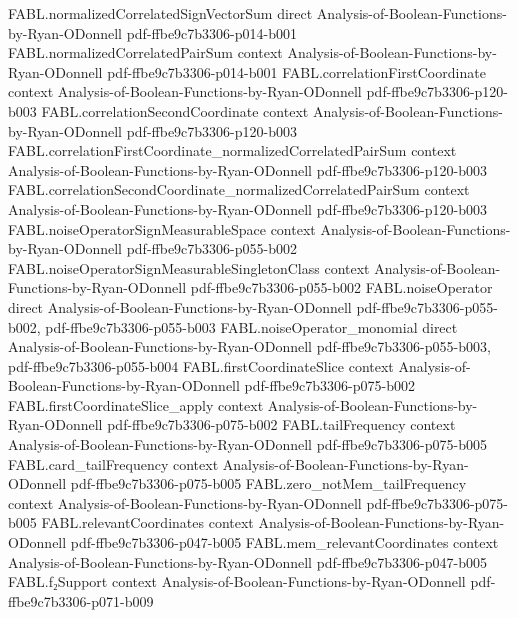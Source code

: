 \begin{theorem}
\proofstep
  {FABL.normalizedCorrelatedSignVectorSum}
  {direct}
  {Analysis-of-Boolean-Functions-by-Ryan-ODonnell}
  {pdf-ffbe9c7b3306-p014-b001}
\proofstep
  {FABL.normalizedCorrelatedPairSum}
  {context}
  {Analysis-of-Boolean-Functions-by-Ryan-ODonnell}
  {pdf-ffbe9c7b3306-p014-b001}
\proofstep
  {FABL.correlationFirstCoordinate}
  {context}
  {Analysis-of-Boolean-Functions-by-Ryan-ODonnell}
  {pdf-ffbe9c7b3306-p120-b003}
\proofstep
  {FABL.correlationSecondCoordinate}
  {context}
  {Analysis-of-Boolean-Functions-by-Ryan-ODonnell}
  {pdf-ffbe9c7b3306-p120-b003}
\proofstep
  {FABL.correlationFirstCoordinate_normalizedCorrelatedPairSum}
  {context}
  {Analysis-of-Boolean-Functions-by-Ryan-ODonnell}
  {pdf-ffbe9c7b3306-p120-b003}
\proofstep
  {FABL.correlationSecondCoordinate_normalizedCorrelatedPairSum}
  {context}
  {Analysis-of-Boolean-Functions-by-Ryan-ODonnell}
  {pdf-ffbe9c7b3306-p120-b003}
\proofstep
  {FABL.noiseOperatorSignMeasurableSpace}
  {context}
  {Analysis-of-Boolean-Functions-by-Ryan-ODonnell}
  {pdf-ffbe9c7b3306-p055-b002}
\proofstep
  {FABL.noiseOperatorSignMeasurableSingletonClass}
  {context}
  {Analysis-of-Boolean-Functions-by-Ryan-ODonnell}
  {pdf-ffbe9c7b3306-p055-b002}
\proofstep
  {FABL.noiseOperator}
  {direct}
  {Analysis-of-Boolean-Functions-by-Ryan-ODonnell}
  {pdf-ffbe9c7b3306-p055-b002,
    pdf-ffbe9c7b3306-p055-b003}
\proofstep
  {FABL.noiseOperator_monomial}
  {direct}
  {Analysis-of-Boolean-Functions-by-Ryan-ODonnell}
  {pdf-ffbe9c7b3306-p055-b003,
    pdf-ffbe9c7b3306-p055-b004}
\proofstep
  {FABL.firstCoordinateSlice}
  {context}
  {Analysis-of-Boolean-Functions-by-Ryan-ODonnell}
  {pdf-ffbe9c7b3306-p075-b002}
\proofstep
  {FABL.firstCoordinateSlice_apply}
  {context}
  {Analysis-of-Boolean-Functions-by-Ryan-ODonnell}
  {pdf-ffbe9c7b3306-p075-b002}
\proofstep
  {FABL.tailFrequency}
  {context}
  {Analysis-of-Boolean-Functions-by-Ryan-ODonnell}
  {pdf-ffbe9c7b3306-p075-b005}
\proofstep
  {FABL.card_tailFrequency}
  {context}
  {Analysis-of-Boolean-Functions-by-Ryan-ODonnell}
  {pdf-ffbe9c7b3306-p075-b005}
\proofstep
  {FABL.zero_notMem_tailFrequency}
  {context}
  {Analysis-of-Boolean-Functions-by-Ryan-ODonnell}
  {pdf-ffbe9c7b3306-p075-b005}
\proofstep
  {FABL.relevantCoordinates}
  {context}
  {Analysis-of-Boolean-Functions-by-Ryan-ODonnell}
  {pdf-ffbe9c7b3306-p047-b005}
\proofstep
  {FABL.mem_relevantCoordinates}
  {context}
  {Analysis-of-Boolean-Functions-by-Ryan-ODonnell}
  {pdf-ffbe9c7b3306-p047-b005}
\proofstep
  {FABL.f₂Support}
  {context}
  {Analysis-of-Boolean-Functions-by-Ryan-ODonnell}
  {pdf-ffbe9c7b3306-p071-b009}

\end{theorem}
